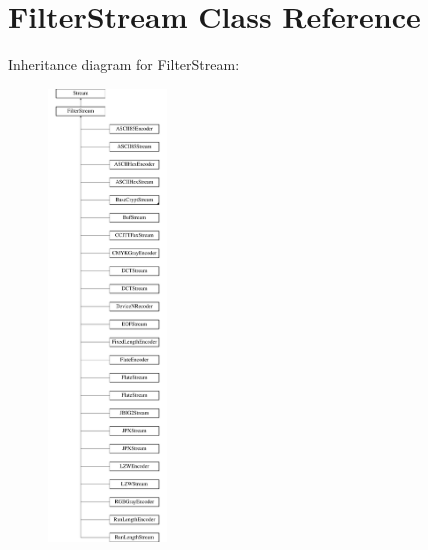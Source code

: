 \hypertarget{class_filter_stream}{}\section{Filter\+Stream Class Reference}
\label{class_filter_stream}
Inheritance diagram for Filter\+Stream\+:\begin{figure}[H]
\begin{center}
\leavevmode
\includegraphics[height=12.000000cm]{class_filter_stream}
\end{center}
\end{figure}
